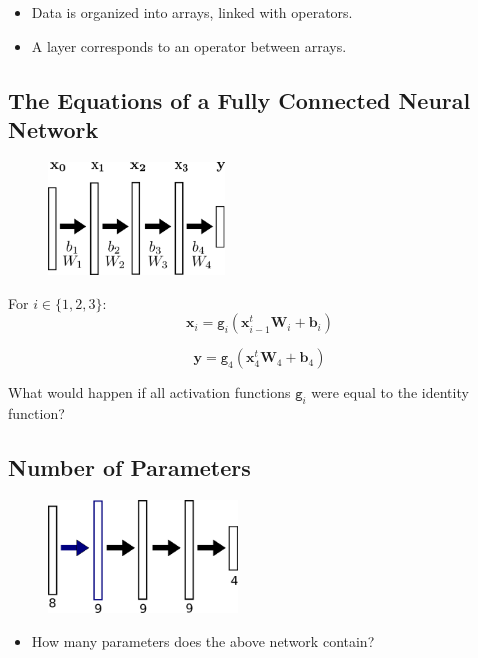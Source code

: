 \documentclass{book}
\newcommand{\x}{\mathbf{x}}
\newcommand{\y}{\mathbf{y}}
\newcommand{\W}{\mathbf{W}} %
\newcommand{\bias}{\mathbf{b}}%
\newcommand{\act}{\texttt{g}}%
\begin{document}
\begin{itemize}
\item Data is organized into arrays, linked with operators.
\item A layer corresponds to an operator between arrays.
\end{itemize}

\subsection{The Equations of a Fully Connected Neural Network}

\begin{figure}[h]
    \centering
    \includegraphics[height=3cm]{nn_representation2}
\end{figure}

\begin{block}{}
For $i \in \{1, 2, 3\}$:
\[
\x_i = \act_i(\x_{i-1}^t \W_i + \bias_i)
\]
\end{block}

\begin{block}{}
\[
\y = \act_4(\x_4^t \W_4 + \bias_4)
\]
\end{block}

What would happen if all activation functions $\act_i$ were equal to the identity function?

\subsection{Number of Parameters}

\begin{figure}[h]
    \centering
    \includegraphics[height=3cm]{nn_representation.png}
\end{figure}

\begin{itemize}
\item How many parameters does the above network contain?
\end{itemize}
\end{document}
